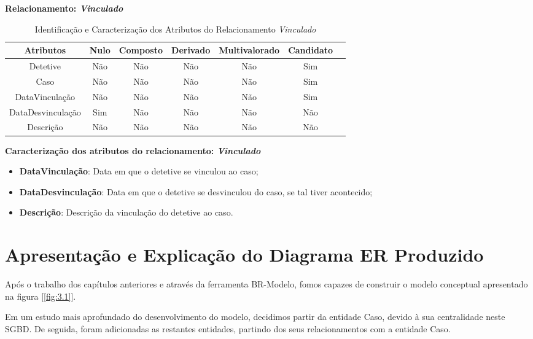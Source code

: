 \documentclass[a4paper,12pt]{scrreprt}
\newcommand{\Nao}{%
    \cellcolor{red!40}Não
}
\newcommand{\Sim}{%
    \cellcolor{green!40}Sim
}
\begin{document}
        \textbf{Relacionamento: \textit{Vinculado}}
        \begin{table}[!ht]
        \centering
        \begin{tabular}{|c|c|c|c|c|c|c|}
        \hline
        \rowcolor{gray!20!white}
        \textbf{Atributos} & \textbf{Nulo} & \textbf{Composto} & \textbf{Derivado} & \textbf{Multivalorado} & \textbf{Candidato} \\
        \hline
        Detetive          & \Nao & \Nao & \Nao & \Nao & \Sim \\
        Caso              & \Nao & \Nao & \Nao & \Nao & \Sim \\
        DataVinculação    & \Nao & \Nao & \Nao & \Nao & \Sim \\
        DataDesvinculação & \Sim & \Nao & \Nao & \Nao & \Nao \\  
        Descrição         & \Nao & \Nao & \Nao & \Nao & \Nao \\
        \hline
        \end{tabular}
        \caption{Identificação e Caracterização dos Atributos do Relacionamento \textit{Vinculado}}
        \end{table}

        \textbf{Caracterização dos atributos do relacionamento: \textit{Vinculado}}
        \begin{itemize}
            \item \textbf{DataVinculação}: Data em que o detetive se vinculou ao caso;
            \item \textbf{DataDesvinculação}: Data em que o detetive se desvinculou do caso, se tal tiver acontecido;
            \item \textbf{Descrição}: Descrição da vinculação do detetive ao caso.
        \end{itemize}


    \clearpage

    \section{Apresentação e Explicação do Diagrama ER Produzido}
        Após o trabalho dos capítulos anteriores e através da ferramenta BR-Modelo, fomos capazes de construir o modelo conceptual apresentado na figura [\ref{fig:3.1}].

        Em um estudo mais aprofundado do desenvolvimento do modelo, decidimos partir da entidade Caso, devido à sua centralidade neste SGBD.
        De seguida, foram adicionadas as restantes entidades, partindo dos seus relacionamentos com a entidade Caso.
\end{document}
